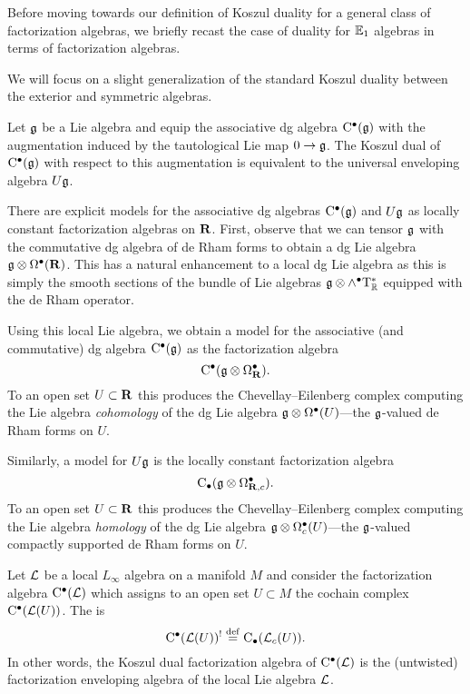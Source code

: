\parsec[s:celine]

Before moving towards our definition of Koszul duality for a general class of factorization algebras, we briefly recast the case of duality for $\mathbb E_1$ algebras in terms of factorization algebras. 

We will focus on a slight generalization of the standard Koszul duality between the exterior and symmetric algebras.

\begin{prop}
Let $\mathfrak{g}$ be a Lie algebra and equip the associative dg algebra ${\rm C}^\bullet(\mathfrak g)$ with the augmentation induced by the tautological Lie map $0 \to \mathfrak{g}$.
The Koszul dual of ${\rm C}^\bullet(\mathfrak{g})$ with respect to this augmentation is equivalent to the universal enveloping algebra $U \mathfrak g$. 
\end{prop}

There are explicit models for the associative dg algebras ${\rm C}^\bullet(\mathfrak{g})$ and $U \mathfrak{g}$ as locally constant factorization algebras on $\mathbf{R}$.
First, observe that we can tensor $\mathfrak g$ with the commutative dg algebra of de Rham forms to obtain a dg Lie algebra $\mathfrak g \otimes \Omega^\bullet(\mathbf{R})$. 
This has a natural enhancement to a local dg Lie algebra as this is simply the smooth sections of the bundle of Lie algebras $\mathfrak g \otimes \wedge^\bullet {\rm T}^*_\mathbb R$ equipped with the de Rham operator.

Using this local Lie algebra, we obtain a model for the associative (and commutative) dg algebra ${\rm C}^\bullet(\mathfrak g)$ as the factorization algebra
\[
{\rm C}^\bullet(\mathfrak g \otimes \Omega^\bullet_{\mathbf{R}}).
\]
To an open set $U \subset \mathbf{R}$ this produces the Chevellay--Eilenberg complex computing the Lie algebra {\em cohomology} of the dg Lie algebra $\mathfrak g \otimes \Omega^\bullet(U)$---the $\mathfrak g$-valued de Rham forms on $U$.
 
Similarly, a model for $U \mathfrak g$ is the locally constant factorization algebra
\[
{\rm C}_\bullet(\mathfrak g \otimes \Omega^\bullet_{\mathbf{R},c}).
\]
To an open set $U \subset \mathbf{R}$ this produces the Chevellay--Eilenberg complex computing the Lie algebra {\em homology} of the dg Lie algebra $\mathfrak g \otimes \Omega^\bullet_c(U)$---the $\mathfrak g$-valued compactly supported de Rham forms on $U$.

\parsec[s:generalkoszul]

\begin{dfn}
Let $\mathcal L$ be a local $L_\infty$ algebra on a manifold $M$ and consider the factorization algebra ${\rm C}^\bullet(\mathcal L)$ which assigns to an open set $U \subset M$ the cochain complex ${\rm C}^\bullet(\mathcal L(U))$. 
The  is 
\[
{\rm C}^\bullet(\mathcal L(U))^! \overset{\rm def}{=} {\rm C}_\bullet (\mathcal L_{c}(U)) .
\]
In other words, the Koszul dual factorization algebra of ${\rm C}^\bullet(\mathcal L)$ is the (untwisted) factorization enveloping algebra of the local Lie algebra $\mathcal L$. 
\end{dfn} 

